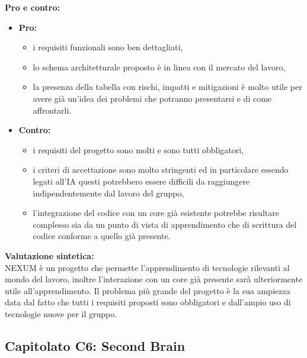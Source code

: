\vspace{0.3cm}
\textbf{Pro e contro:}
\begin{itemize}
	\item \textbf{Pro:}
        \begin{itemize}
            \item i requisiti funzionali sono ben dettagliati,
            \item lo schema architetturale proposto è in linea con il mercato del lavoro,
            \item la presenza della tabella con rischi, impatti e mitigazioni è molto utile per avere già un'idea dei problemi che potranno presentarsi e di come affrontarli.
        \end{itemize}
	\item \textbf{Contro:}
        \begin{itemize}
            \item i requisiti del progetto sono molti e sono tutti obbligatori,
            \item i criteri di accettazione sono molto stringenti ed in particolare essendo legati all'IA questi potrebbero essere difficili da raggiungere indipendentemente dal lavoro del gruppo,
            \item l'integrazione del codice con un core già esistente potrebbe risultare complesso sia da un punto di vista di apprendimento che di scrittura del codice conforme a quello già presente.
        \end{itemize}
\end{itemize}

\vspace{0.3cm}
\textbf{Valutazione sintetica:} \\
NEXUM è un progetto che permette l'apprendimento di tecnologie rilevanti al mondo del lavoro, inoltre l'interazione con un core già presente sarà ulteriormente utile all'apprendimento. Il problema più grande del progetto è la sua ampiezza data dal fatto che tutti i requisiti proposti sono obbligatori e dall'ampio uso di tecnologie nuove per il gruppo.

\vspace{0.5cm}

\vspace{0.5cm}

\subsection{Capitolato C6: {Second Brain} }

